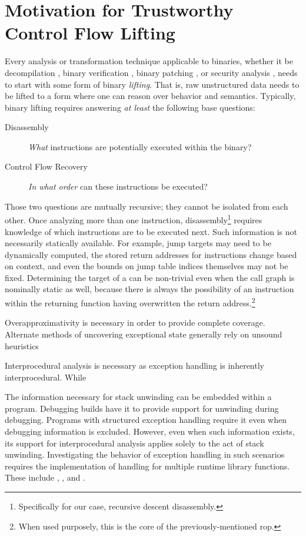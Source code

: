 \section{Motivation for Trustworthy Control Flow Lifting}
Every analysis or transformation technique applicable to binaries, whether it be decompilation \autocite{brumley2013native,dinaburg2014mcsema}, binary verification \autocite{goelphd,brumley2011bap,tan2015auspice}, binary patching \autocite{wartell2012binary,kim2017revarm}, or security analysis \autocite{kruegel2005automating,song2008bitblaze,davi2009dynamic,wang2017angr}, needs to start with some form of binary \emph{lifting}.
That is, raw unstructured data needs to be lifted to a form where one can reason over behavior and semantics.
Typically, binary lifting requires answering \emph{at least} the following base questions:
\begin{description}
  \item[Disassembly] \emph{What} instructions are potentially executed within the binary?
  \item[Control Flow Recovery] \emph{In what order} can these instructions be executed?
\end{description}
Those two questions are mutually recursive; they cannot be isolated from each other.
Once analyzing more than one instruction, disassembly\footnote{%
  Specifically for our case, recursive descent disassembly.%
}
requires knowledge of which instructions are to be executed next.
Such information is not necessarily statically available. For example, jump targets may need to be dynamically computed, the stored return addresses for  instructions change based on context, and even the bounds on jump table indices themselves may not be fixed.
Determining the target of a  can be non-trivial even when the call graph is nominally static as well, because there is always the possibility of an instruction within the returning function having overwritten the return address.\footnote{When used purposely, this is the core of the previously-mentioned \ac{rop}.}

Overapproximativity is necessary in order to provide complete coverage.
Alternate methods of uncovering exceptional state generally rely on unsound heuristics

Interprocedural analysis is necessary as exception handling is inherently interprocedural. While


The information necessary for stack unwinding can be embedded within a program.
Debugging builds have it to provide support for unwinding during debugging.
Programs with structured exception handling require it even when debugging information is excluded.
However, even when such information exists, its support for interprocedural
analysis applies solely to the act of stack unwinding.
Investigating the behavior of exception handling in such scenarios requires the implementation of handling for multiple runtime library functions.
These include , ,
and .

